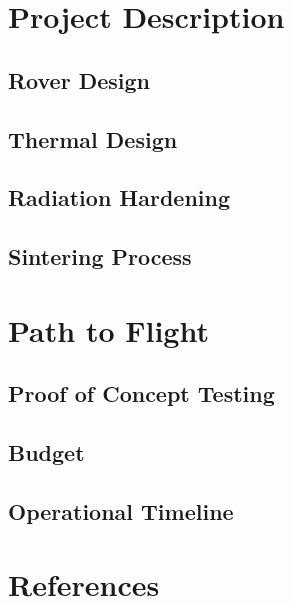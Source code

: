 \documentclass[10pt]{article}
\begin{document}
\section{Project Description}

\subsection{Rover Design}

\subsection{Thermal Design}

\subsection{Radiation Hardening}

\subsection{Sintering Process}

\section{Path to Flight}

\subsection{Proof of Concept Testing}

\subsection{Budget}

\subsection{Operational Timeline}


\section{References}
\end{document}

